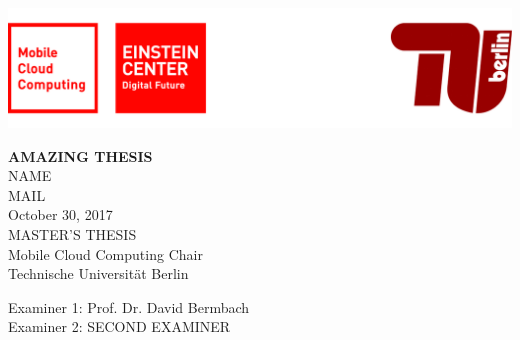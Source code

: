 
\thispagestyle{empty}

\includegraphics[width=\linewidth]{fig/Logo_Header}
\mbox{}\\[1pc]
\begin{center}
    \huge{ \bfseries AMAZING THESIS}\\[2pc]

    \Large{NAME}\\
    \large{MAIL}\\[1pc]
    \large{October 30, 2017}\\[2pc]

    MASTER'S THESIS\\
    Mobile Cloud Computing Chair\\
    Technische Universität Berlin
\end{center}
\vfill

Examiner 1: Prof. Dr. David Bermbach
\hfill{}\\
Examiner 2: SECOND EXAMINER

\afterpage{\null\thispagestyle{empty}\newpage}
